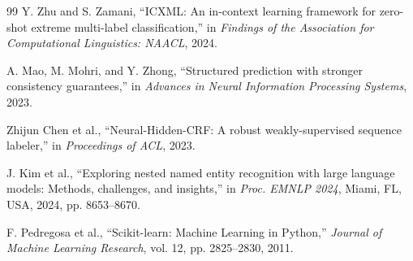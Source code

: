 \begin{thebibliography}{99}
  Y. Zhu and S. Zamani,
  ``ICXML: An in-context learning framework for zero-shot extreme multi-label classification,''
  in \textit{Findings of the Association for Computational Linguistics: NAACL}, 2024.

  A. Mao, M. Mohri, and Y. Zhong,
  ``Structured prediction with stronger consistency guarantees,''
  in \textit{Advances in Neural Information Processing Systems}, 2023.

  Zhijun Chen et al.,
  ``Neural-Hidden-CRF: A robust weakly-supervised sequence labeler,''
  in \textit{Proceedings of ACL}, 2023.

J. Kim et al., ``Exploring nested named entity recognition with large language models: Methods, challenges, and insights,'' in \textit{Proc. EMNLP 2024}, Miami, FL, USA, 2024, pp. 8653--8670.

  F. Pedregosa et al.,
  ``Scikit-learn: Machine Learning in Python,''
  \textit{Journal of Machine Learning Research}, vol. 12, pp. 2825--2830, 2011.

\end{thebibliography}